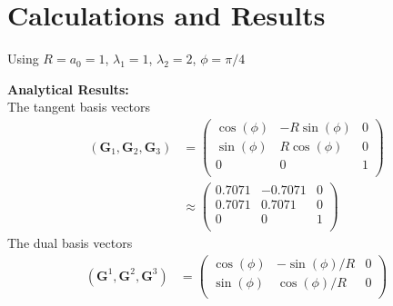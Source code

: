 \documentclass[../main.tex]{subfiles}
\begin{document}
\section{Calculations and Results}


Using $R = a_0 = 1$, $\lambda_1 = 1$, $\lambda_2 = 2$, $\phi = \pi/4$

\begin{minipage}[t]{0.5\textwidth}
  \textbf{Analytical Results:}\\
	
  The tangent basis vectors
  \begin{align*}
    \left(\mathbf{G}_1,\mathbf{G}_2,\mathbf{G}_3\right) &=
                                                          \begin{pmatrix}
                                                            \cos(\phi) & -R\sin(\phi) & 0\\
                                                            \sin(\phi) &  R\cos(\phi)& 0\\
                                                            0 & 0 & 1\\
                                                          \end{pmatrix}\\
                                                        &\approx
                                                          \begin{pmatrix}
                                                            0.7071 & -0.7071 & 0\\
                                                            0.7071 &  0.7071 & 0\\
                                                            0& 0 & 1\\
                                                          \end{pmatrix}
  \end{align*}
  The dual basis vectors
  \begin{align*}
    \left(\mathbf{G}^1,\mathbf{G}^2,\mathbf{G}^3\right) &=
                                                          \begin{pmatrix}
                                                            \cos(\phi) & -\sin(\phi)/R & 0\\
                                                            \sin(\phi) &  \cos(\phi)/R& 0\\

\end{pmatrix}
\end{align*}
\end{minipage}
\end{document}
